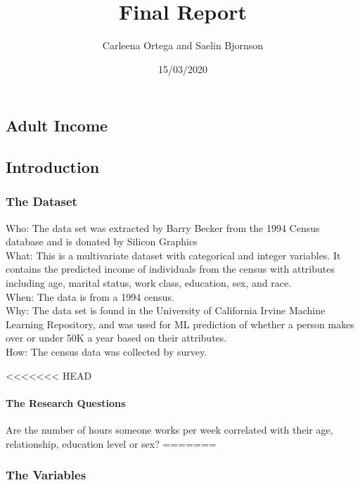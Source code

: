 \documentclass[]{article}
\title{Final Report}
\author{Carleena Ortega and Saelin Bjornson}
\date{15/03/2020}
\let\oldparagraph\paragraph
\renewcommand{\paragraph}[1]{\oldparagraph{#1}\mbox{}}
\begin{document}
\maketitle

{
\setcounter{tocdepth}{4}
\tableofcontents
}
\hypertarget{adult-income}{%
\subsection{Adult Income}\label{adult-income}}

\hypertarget{introduction}{%
\subsection{Introduction}\label{introduction}}

\hypertarget{the-dataset}{%
\subsubsection{The Dataset}\label{the-dataset}}

Who: The data set was extracted by Barry Becker from the 1994 Census
database and is donated by Silicon Graphics\\
What: This is a multivariate dataset with categorical and integer
variables. It contains the predicted income of individuals from the
census with attributes including age, marital status, work class,
education, sex, and race.\\
When: The data is from a 1994 census.\\
Why: The data set is found in the University of California Irvine
Machine Learning Repository, and was used for ML prediction of whether a
person makes over or under 50K a year based on their attributes.\\
How: The census data was collected by survey.

<<<<<<< HEAD
\hypertarget{the-research-questions}{%
\paragraph{The Research Questions}\label{the-research-questions}}

Are the number of hours someone works per week correlated with their
age, relationship, education level or sex?
=======
\hypertarget{the-variables}{%
\subsubsection{The Variables}\label{the-variables}}
\end{document}
